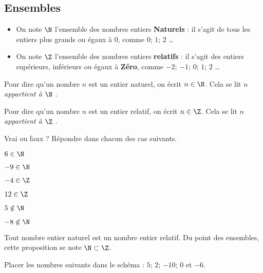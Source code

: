 \documentclass{article}
\begin{document}
\subsection{Ensembles}
\begin{definition}
\hfill
\begin{itemize}
\item On note $\N$ l'ensemble des nombres entiers \textbf{Naturels} : il s'agit de tous les entiers plus grands ou égaux à $0$, comme $0$; $1$; $2$ \dots
\item On note $\Z$ l'ensemble des nombres entiers \textbf{relatifs} : il s'agit des entiers supérieurs, inférieurs ou égaux à \textbf{Zéro}, comme $-2$; $-1$; $0$; $1$; $2$ \dots
\end{itemize}
\end{definition}
\begin{definition}
\hfill

Pour dire qu'un nombre $n$ est un entier naturel, on écrit $n \in \N$. Cela se lit \emph{\og $n$ appartient à $\N$ \fg}.

Pour dire qu'un nombre $n$ est un entier relatif, on écrit $n \in \Z$. Cela se lit \emph{\og $n$ appartient à $\Z$ \fg}.
\end{definition}
\begin{example}
Vrai ou faux ? Répondre dans chacun des cas suivants.
\begin{enumquestions}
\begin{minipage}{0.45\textwidth}
\item $6 \in \N$ \answersline
\item $-9 \in \N$ \answersline
\item $-4 \in \Z$ \answersline
\end{minipage}
\hfill
\begin{minipage}{0.45\textwidth}
\item $12 \in \Z$ \answersline        
\item $5 \notin \N$ \answersline
\item $-8 \notin \N$ \answersline
\end{minipage}
\end{enumquestions}
\end{example}
\begin{proposition}
Tout nombre entier naturel est un nombre entier relatif. Du point des ensembles, cette proposition se note $\N \subset \Z$.
\end{proposition}
\begin{example}
Placer les nombres suivants dans le schéma : $5$; $2$; $-10$; $0$ et $-6$.
\begin{center}
\end{center}
\end{example}
\newpage
\end{document}
